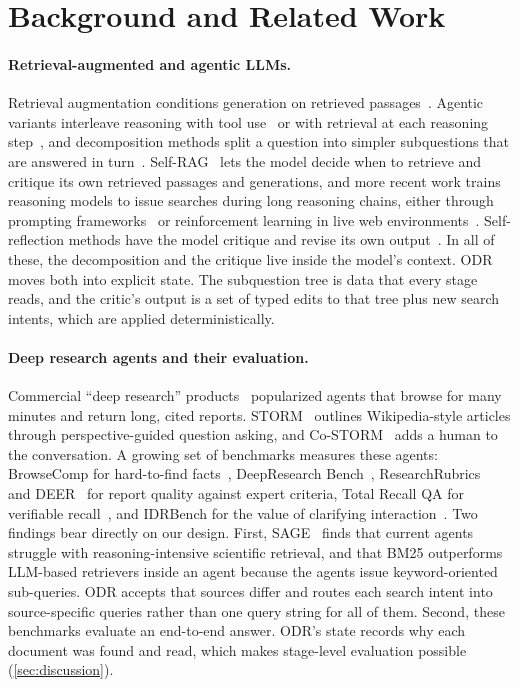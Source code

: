 \documentclass{article}
\newcommand{\sys}{ODR}
\begin{document}
\section{Background and Related Work}
\label{sec:related}

\paragraph{Retrieval-augmented and agentic LLMs.}
Retrieval augmentation conditions generation on retrieved
passages~\citep{lewis2020rag}. Agentic variants interleave reasoning with
tool use~\citep{yao2023react} or with retrieval at each reasoning
step~\citep{trivedi2023ircot,wei2022cot}, and decomposition methods split a
question into simpler subquestions that are answered in
turn~\citep{press2023selfask,zhou2023leasttomost}. Self-RAG~\citep{asai2024selfrag}
lets the model decide when to retrieve and critique its own retrieved
passages and generations, and more recent work trains reasoning models to
issue searches during long reasoning chains, either through prompting
frameworks~\citep{li2025searcho1} or reinforcement learning in live web
environments~\citep{zheng2025deepresearcher}.
Self-reflection methods have the model critique and revise its own
output~\citep{shinn2023reflexion,madaan2023selfrefine}. In all of these, the
decomposition and the critique live inside the model's context. \sys{}
moves both into explicit state. The subquestion tree is data that every
stage reads, and the critic's output is a set of typed edits to that tree
plus new search intents, which are applied deterministically.

\paragraph{Deep research agents and their evaluation.}
Commercial ``deep research'' products~\citep{openai2025deepresearch} popularized agents that browse for many minutes and return long, cited reports. STORM~\citep{shao2024storm} outlines Wikipedia-style articles through perspective-guided question asking, and Co-STORM~\citep{jiang2024costorm} adds a human to the conversation. A growing set of benchmarks measures these agents: BrowseComp for hard-to-find facts~\citep{wei2025browsecomp}, DeepResearch Bench~\citep{du2025deepresearchbench}, ResearchRubrics~\citep{sharma2025researchrubrics} and DEER~\citep{han2025deer} for report quality against expert criteria, Total Recall QA for verifiable recall~\citep{rafiee2026totalrecall}, and IDRBench for the value of clarifying interaction~\citep{feng2026idrbench}. Two findings bear directly on our design. First, SAGE~\citep{hu2026sage} finds that current agents struggle with reasoning-intensive scientific retrieval, and that BM25 outperforms LLM-based retrievers inside an agent because the agents issue keyword-oriented sub-queries. \sys{} accepts that sources differ and routes each search intent into source-specific queries rather than one
query string for all of them. Second, these benchmarks evaluate an
end-to-end answer. \sys{}'s state records why each document was found and
read, which makes stage-level evaluation possible (\cref{sec:discussion}).
\end{document}
